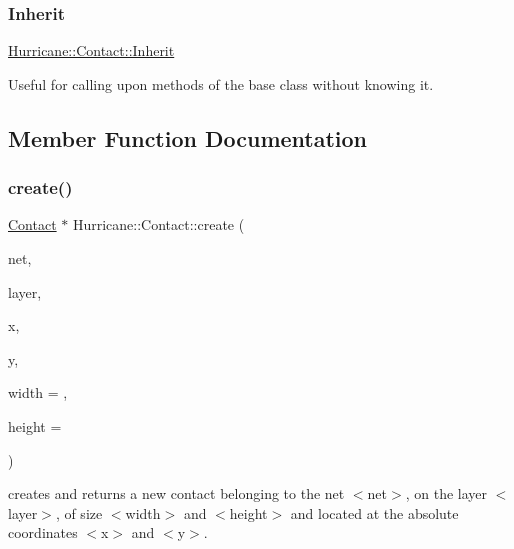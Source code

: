 \subsubsection{\texorpdfstring{Inherit}{Inherit}}
{\footnotesize\ttfamily \hyperlink{classHurricane_1_1Contact_a422f15bba0561d8499c001fb8cbe6b67}{Hurricane\+::\+Contact\+::\+Inherit}}

Useful for calling upon methods of the base class without knowing it. 

\subsection{Member Function Documentation}
\mbox{\label{classHurricane_1_1Contact_a5402fec0518c81d35fbec2c2b2ec0f8f}} 
\subsubsection{\texorpdfstring{create()}{create()}\hspace{0.1cm}{\footnotesize\ttfamily [1/2]}}
{\footnotesize\ttfamily \hyperlink{classHurricane_1_1Contact}{Contact} $\ast$ Hurricane\+::\+Contact\+::create (\begin{DoxyParamCaption}\item[{\hyperlink{classHurricane_1_1Net}{Net} $\ast$}]{net,  }\item[{const \hyperlink{classHurricane_1_1Layer}{Layer} $\ast$}]{layer,  }\item[{const \hyperlink{group__DbUGroup_ga4fbfa3e8c89347af76c9628ea06c4146}{Db\+U\+::\+Unit} \&}]{x,  }\item[{const \hyperlink{group__DbUGroup_ga4fbfa3e8c89347af76c9628ea06c4146}{Db\+U\+::\+Unit} \&}]{y,  }\item[{const \hyperlink{group__DbUGroup_ga4fbfa3e8c89347af76c9628ea06c4146}{Db\+U\+::\+Unit} \&}]{width = {},  }\item[{const \hyperlink{group__DbUGroup_ga4fbfa3e8c89347af76c9628ea06c4146}{Db\+U\+::\+Unit} \&}]{height = {} }\end{DoxyParamCaption})\hspace{0.3cm}{\ttfamily [static]}}

creates and returns a new contact belonging to the net {\ttfamily $<$net$>$}, on the layer {\ttfamily $<$layer$>$}, of size {\ttfamily $<$width$>$} and {\ttfamily $<$height$>$} and located at the absolute coordinates {\ttfamily $<$x$>$} and {\ttfamily $<$y$>$}.

